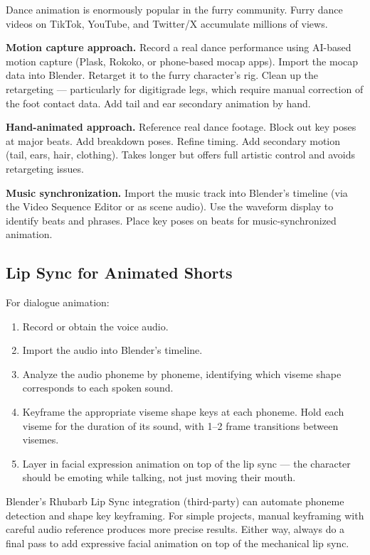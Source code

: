 Dance animation is enormously popular in the furry community. Furry dance videos on TikTok, YouTube, and Twitter/X accumulate millions of views.

\textbf{Motion capture approach.} Record a real dance performance using AI-based motion capture (Plask, Rokoko, or phone-based mocap apps). Import the mocap data into Blender. Retarget it to the furry character's rig. Clean up the retargeting --- particularly for digitigrade legs, which require manual correction of the foot contact data. Add tail and ear secondary animation by hand.

\textbf{Hand-animated approach.} Reference real dance footage. Block out key poses at major beats. Add breakdown poses. Refine timing. Add secondary motion (tail, ears, hair, clothing). Takes longer but offers full artistic control and avoids retargeting issues.

\textbf{Music synchronization.} Import the music track into Blender's timeline (via the Video Sequence Editor or as scene audio). Use the waveform display to identify beats and phrases. Place key poses on beats for music-synchronized animation.


\subsection{Lip Sync for Animated Shorts}

For dialogue animation:

\begin{enumerate}[leftmargin=2em]
  \item Record or obtain the voice audio.
  \item Import the audio into Blender's timeline.
  \item Analyze the audio phoneme by phoneme, identifying which viseme shape corresponds to each spoken sound.
  \item Keyframe the appropriate viseme shape keys at each phoneme. Hold each viseme for the duration of its sound, with 1--2 frame transitions between visemes.
  \item Layer in facial expression animation on top of the lip sync --- the character should be emoting while talking, not just moving their mouth.
\end{enumerate}

\begin{tipbox}
Blender's Rhubarb Lip Sync integration (third-party) can automate phoneme detection and shape key keyframing. For simple projects, manual keyframing with careful audio reference produces more precise results. Either way, always do a final pass to add expressive facial animation on top of the mechanical lip sync.
\end{tipbox}


